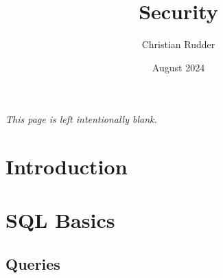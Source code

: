 \documentclass{article}
\title{Security}
\author{Christian Rudder}
\date{August 2024}
\begin{document}
\maketitle

\tableofcontents

\newpage
\thispagestyle{empty}
\mbox{}
\vfill
\begin{center}
    \textit{This page is left intentionally blank.}
\end{center}
\vfill
\newpage

\section{Introduction}


\section{SQL Basics}

\subsection{Queries}

\end{document}
